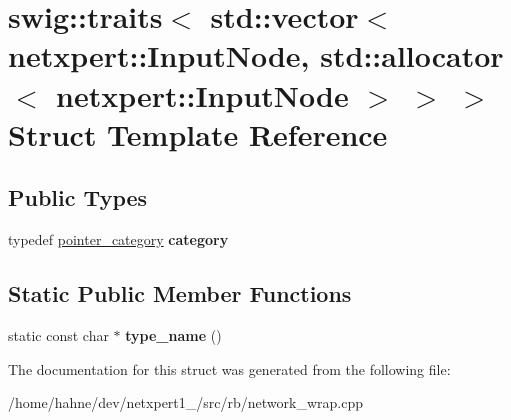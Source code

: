 \hypertarget{structswig_1_1traits_3_01std_1_1vector_3_01netxpert_1_1InputNode_00_01std_1_1allocator_3_01netxpert_1_1InputNode_01_4_01_4_01_4}{}\section{swig\+:\+:traits$<$ std\+:\+:vector$<$ netxpert\+:\+:Input\+Node, std\+:\+:allocator$<$ netxpert\+:\+:Input\+Node $>$ $>$ $>$ Struct Template Reference}
\label{structswig_1_1traits_3_01std_1_1vector_3_01netxpert_1_1InputNode_00_01std_1_1allocator_3_01netxpert_1_1InputNode_01_4_01_4_01_4}
\subsection*{Public Types}
\begin{DoxyCompactItemize}
\item 
typedef \hyperlink{structswig_1_1pointer__category}{pointer\+\_\+category} {\bfseries category}\hypertarget{structswig_1_1traits_3_01std_1_1vector_3_01netxpert_1_1InputNode_00_01std_1_1allocator_3_01netxpert_1_1InputNode_01_4_01_4_01_4_ad64c35a68060bc6afd50efb81cd002b1}{}\label{structswig_1_1traits_3_01std_1_1vector_3_01netxpert_1_1InputNode_00_01std_1_1allocator_3_01netxpert_1_1InputNode_01_4_01_4_01_4_ad64c35a68060bc6afd50efb81cd002b1}

\end{DoxyCompactItemize}
\subsection*{Static Public Member Functions}
\begin{DoxyCompactItemize}
\item 
static const char $\ast$ {\bfseries type\+\_\+name} ()\hypertarget{structswig_1_1traits_3_01std_1_1vector_3_01netxpert_1_1InputNode_00_01std_1_1allocator_3_01netxpert_1_1InputNode_01_4_01_4_01_4_aca924ffaeac85d58de0f805d82940859}{}\label{structswig_1_1traits_3_01std_1_1vector_3_01netxpert_1_1InputNode_00_01std_1_1allocator_3_01netxpert_1_1InputNode_01_4_01_4_01_4_aca924ffaeac85d58de0f805d82940859}

\end{DoxyCompactItemize}


The documentation for this struct was generated from the following file\+:\begin{DoxyCompactItemize}
\item 
/home/hahne/dev/netxpert1\+\_/src/rb/network\+\_\+wrap.\+cpp\end{DoxyCompactItemize}
